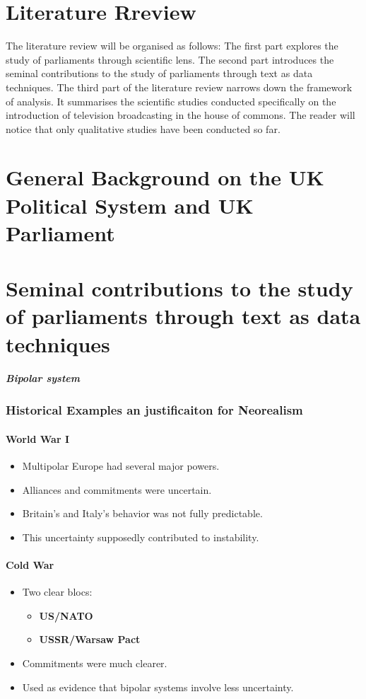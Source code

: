 \section{Literature Rreview}
The literature review will be organised as follows: The first part explores the study of parliaments through scientific lens. The second part introduces the seminal contributions to the study of parliaments through text as data techniques. The third part of the literature review narrows down the framework of analysis. It summarises the scientific studies conducted specifically on the introduction of television broadcasting in the house of commons. The reader will notice that only qualitative studies have been conducted so far.

\newpage

\section{General Background on the UK Political System and UK Parliament}


\section{Seminal contributions to the study of parliaments through text as data techniques}


\subparagraph*{Bipolar system}


\subsubsection{Historical Examples an justificaiton for Neorealism}

\paragraph*{World War I}
\begin{itemize}
    \item Multipolar Europe had several major powers.
    \item Alliances and commitments were uncertain.
    \item Britain’s and Italy’s behavior was not fully predictable.
    \item This uncertainty supposedly contributed to instability.
\end{itemize}

\paragraph*{Cold War}
\begin{itemize}
    \item Two clear blocs:
    \begin{itemize}
        \item \textbf{US/NATO}
        \item \textbf{USSR/Warsaw Pact}
    \end{itemize}
    \item Commitments were much clearer.
    \item Used as evidence that bipolar systems involve less uncertainty.
\end{itemize}